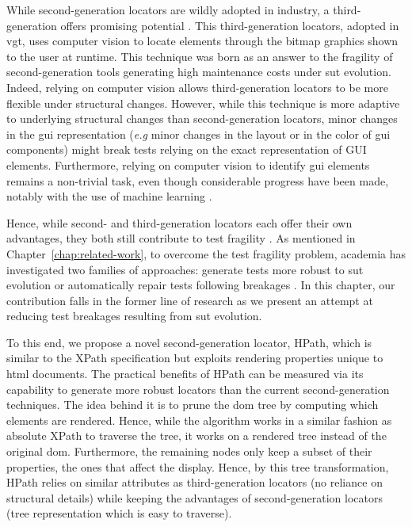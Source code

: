 While second-generation locators are wildly adopted in industry, a third-generation offers promising potential \cite{Alegroth2015}. This third-generation locators, adopted in \gls{vgt}, uses computer vision to locate elements through the bitmap graphics shown to the user at runtime. This technique was born as an answer to the fragility of second-generation tools generating high maintenance costs under \gls{sut} evolution. Indeed, relying on computer vision allows third-generation locators to be more flexible under structural changes. However, while this technique is more adaptive to underlying structural changes than second-generation locators, minor changes in the \gls{gui} representation (\emph{e.g} minor changes in the layout or in the color of \gls{gui} components) might break tests relying on the exact representation of GUI elements. Furthermore, relying on computer vision to identify \gls{gui} elements remains a non-trivial task, even though considerable progress have been made, notably with the use of machine learning \cite{White2019}.

Hence, while second- and third-generation locators each offer their own advantages, they both still contribute to test fragility \cite{Aldalur2017, Alegroth2018}. As mentioned in Chapter~\ref{chap:related-work}, to overcome the test fragility problem, academia has investigated two families of approaches: generate tests more robust to \gls{sut} evolution \cite{Montoto2011, Thummalapenta2013, Leotta2014, Yandrapally2014, Leotta2015, Leotta2016, Zheng2018} or automatically repair tests following breakages \cite{Choudhary2011, Stocco2018, Kirinuki2019}. In this chapter, our contribution falls in the former line of research as we present an attempt at reducing test breakages resulting from \gls{sut} evolution. 

To this end, we propose a novel second-generation locator, HPath, which is similar to the XPath specification but exploits rendering properties unique to \gls{html} documents. The practical benefits of HPath can be measured via its capability to generate more robust locators than the current second-generation techniques. The idea behind it is to prune the \gls{dom} tree by computing which elements are rendered. Hence, while the algorithm works in a similar fashion as absolute XPath to traverse the tree, it works on a rendered tree instead of the original \gls{dom}. Furthermore, the remaining nodes only keep a subset of their properties, the ones that affect the display. Hence, by this tree transformation, HPath relies on similar attributes as third-generation locators (no reliance on structural details) while keeping the advantages of second-generation locators (tree representation which is easy to traverse).

